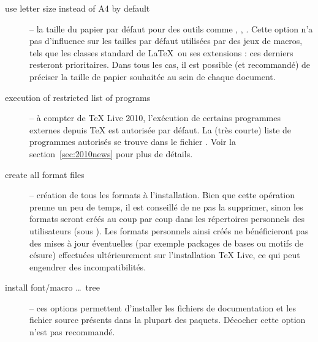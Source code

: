 \documentclass[german, english, french]{article}
\renewcommand{\TL}{\TeX{} Live\xspace}%
\begin{document}
\begin{description}
\item[use letter size instead of A4 by default] -- la taille du papier par
  défaut pour des outils comme , , .  Cette
  option n'a pas d'influence sur les tailles par défaut utilisées par des jeux
  de macros, tels que les classes standard de \LaTeX\ ou ses extensions : ces
  derniers resteront prioritaires. Dans tous les cas, il est possible (et
  recommandé) de préciser la taille de papier souhaitée au sein de chaque
  document.

\item[execution of restricted list of programs] -- à compter de \TL 2010,
  l'exécution de certains programmes externes depuis \TeX{} est autorisée par
  défaut. La (très courte) liste de programmes autorisés se trouve dans le
  fichier . Voir la section~\ref{sec:2010news} pour plus de
  détails.

\item[create all format files] -- création de tous les formats à l'installation.
  Bien que cette opération prenne un peu de temps, il est conseillé de ne pas la
  supprimer, sinon les formats seront créés au coup par coup dans les
  répertoires personnels des utilisateurs (sous ). Les formats
  personnels ainsi créés ne bénéficieront pas des mises à jour éventuelles (par
  exemple packages de bases ou motifs de césure) effectuées ultérieurement sur
  l'installation \TL{}, ce qui peut engendrer des incompatibilités.

\item[install font/macro \ldots\ tree] -- ces options permettent d'installer les
  fichiers de documentation et les fichier source présents dans la plupart des
  paquets. Décocher cette option n'est pas recommandé.


\end{description}
\end{document}
